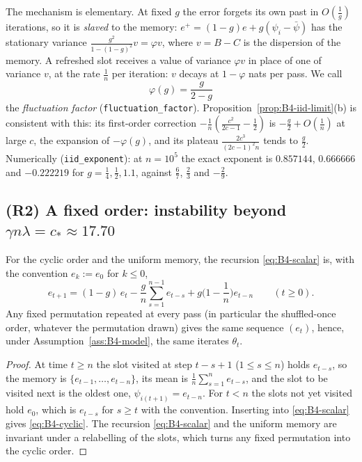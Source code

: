 \noindent The mechanism is elementary. At fixed $g$ the error forgets its own past in $O(\frac1g)$ iterations, so it is \emph{slaved} to the memory: $e^+=(1-g)e+g(\psi_i-\bar\psi)$ has the stationary variance $\frac{g^2}{1-(1-g)^2}v=\varphi v$, where $v=B-C$ is the dispersion of the memory. A refreshed slot receives a value of variance $\varphi v$ in place of one of variance $v$, at the rate $\frac1n$ per iteration: $v$ decays at $1-\varphi$ nats per pass. We call
\[
\varphi(g)=\frac g{2-g}
\]
the \emph{fluctuation factor} (\texttt{fluctuation\_factor}). Proposition~\ref{prop:B4-iid-limit}(b) is consistent with this: its first-order correction $-\frac1n(\frac{c^2}{2c-1}-\frac12)$ is $-\frac g2+O(\frac1n)$ at large $c$, the expansion of $-\varphi(g)$, and its plateau $\frac{2c^3}{(2c-1)^2n}$ tends to $\frac g2$. Numerically (\texttt{iid\_exponent}): at $n=10^5$ the exact exponent is $0.857144$, $0.666666$ and $-0.222219$ for $g=\frac14,\frac12,1.1$, against $\frac67$, $\frac23$ and $-\frac29$.

\subsection{(R2) A fixed order: instability beyond \texorpdfstring{$\gamma n\lambda=c_\ast\approx17.70$}{gamma n lambda = 17.70}}\label{sec:B4-cyclic}

\begin{lemma}\label{lem:B4-cyclic}
For the cyclic order and the uniform memory, the recursion \eqref{eq:B4-scalar} is, with the convention $e_k:=e_0$ for $k\le0$,
\begin{equation}\label{eq:B4-cyclic}
e_{t+1}=(1-g)\,e_t-\frac gn\sum_{s=1}^{n-1}e_{t-s}+g\Big(1-\frac1n\Big)e_{t-n}\qquad(t\ge0).
\end{equation}
Any fixed permutation repeated at every pass (in particular the shuffled-once order, whatever the permutation drawn) gives the same sequence $(e_t)$, hence, under Assumption~\ref{ass:B4-model}, the same iterates $\theta_t$.
\end{lemma}
\begin{proof}
At time $t\ge n$ the slot visited at step $t-s+1$ ($1\le s\le n$) holds $e_{t-s}$, so the memory is $\{e_{t-1},\dots,e_{t-n}\}$, its mean is $\frac1n\sum_{s=1}^ne_{t-s}$, and the slot to be visited next is the oldest one, $\psi_{i(t+1)}=e_{t-n}$. For $t<n$ the slots not yet visited hold $e_0$, which is $e_{t-s}$ for $s\ge t$ with the convention. Inserting into \eqref{eq:B4-scalar} gives \eqref{eq:B4-cyclic}. The recursion \eqref{eq:B4-scalar} and the uniform memory are invariant under a relabelling of the slots, which turns any fixed permutation into the cyclic order.
\end{proof}

